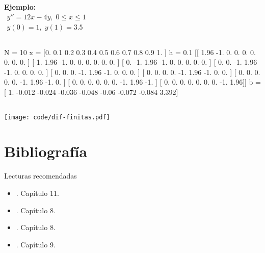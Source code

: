 \documentclass[9pt, aspectratio=169]{beamer}
\begin{document}
\begin{frame}
\begin{columns}[t]
\textbf{Ejemplo:}
\[ \begin{split} y'' = 12 x - 4 y, \; 0 \leq x \leq 1 \\ y(0) = 1,\; y(1) = 3.5 \end{split} \]

\end{columns}
\end{frame}

\begin{frame}[fragile]
    \begin{columns}

\begin{shell}
N = 10
x =  [0.  0.1 0.2 0.3 0.4 0.5 0.6 0.7 0.8 0.9 1. ] h =  0.1
[[ 1.96 -1.    0.    0.    0.    0.    0.    0.    0.  ]
 [-1.    1.96 -1.    0.    0.    0.    0.    0.    0.  ]
 [ 0.   -1.    1.96 -1.    0.    0.    0.    0.    0.  ]
 [ 0.    0.   -1.    1.96 -1.    0.    0.    0.    0.  ]
 [ 0.    0.    0.   -1.    1.96 -1.    0.    0.    0.  ]
 [ 0.    0.    0.    0.   -1.    1.96 -1.    0.    0.  ]
 [ 0.    0.    0.    0.    0.   -1.    1.96 -1.    0.  ]
 [ 0.    0.    0.    0.    0.    0.   -1.    1.96 -1.  ]
 [ 0.    0.    0.    0.    0.    0.    0.   -1.    1.96]]
b =  [ 1.    -0.012 -0.024 -0.036 -0.048 -0.06  -0.072 -0.084  3.392]
\end{shell}
\end{columns}
\end{frame}

\begin{frame}
\begin{center}
    \texttt{[image: code/dif-finitas.pdf]}
\end{center}
\end{frame}

\section*{Bibliografía}
\begin{frame}{Lecturas recomendadas}
\begin{itemize}
    \item {}. Capítulo 11.
    \item {}. Capítulo 8.
    \item {}. Capítulo 8.
    \item {}. Capítulo 9.
\end{itemize}
\end{frame}
\end{document}

